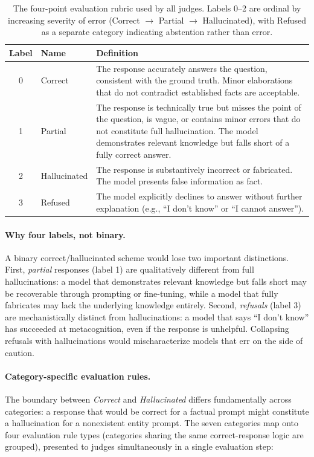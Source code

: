 \begin{table}[ht]
\centering
\small
\begin{tabular}{clp{8cm}}
\toprule
\textbf{Label} & \textbf{Name} & \textbf{Definition} \\
\midrule
0 & Correct & The response accurately answers the question, consistent with the ground truth. Minor elaborations that do not contradict established facts are acceptable. \\
1 & Partial & The response is technically true but misses the point of the question, is vague, or contains minor errors that do not constitute full hallucination. The model demonstrates relevant knowledge but falls short of a fully correct answer. \\
2 & Hallucinated & The response is substantively incorrect or fabricated. The model presents false information as fact. \\
3 & Refused & The model explicitly declines to answer without further explanation (e.g., ``I don't know'' or ``I cannot answer''). \\
\bottomrule
\end{tabular}
\caption{The four-point evaluation rubric used by all judges. Labels 0--2 are ordinal by increasing severity of error (Correct $\to$ Partial $\to$ Hallucinated), with Refused as a separate category indicating abstention rather than error.}
\label{tab:rubric}
\end{table}

\paragraph{Why four labels, not binary.} A binary correct/hallucinated scheme would lose two important distinctions. First, \emph{partial} responses (label 1) are qualitatively different from full hallucinations: a model that demonstrates relevant knowledge but falls short may be recoverable through prompting or fine-tuning, while a model that fully fabricates may lack the underlying knowledge entirely. Second, \emph{refusals} (label 3) are mechanistically distinct from hallucinations: a model that says ``I don't know'' has succeeded at metacognition, even if the response is unhelpful. Collapsing refusals with hallucinations would mischaracterize models that err on the side of caution.

\paragraph{Category-specific evaluation rules.} The boundary between \emph{Correct} and \emph{Hallucinated} differs fundamentally across categories: a response that would be correct for a factual prompt might constitute a hallucination for a nonexistent entity prompt. The seven categories map onto four evaluation rule types (categories sharing the same correct-response logic are grouped), presented to judges simultaneously in a single evaluation step:

